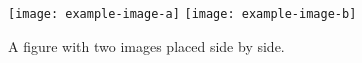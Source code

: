 \begin{figure}[thb] \centering
    \texttt{[image: example-image-a]}
    \texttt{[image: example-image-b]}
    \caption{A figure with two images placed side by side.} \label{fig:figure2}
\end{figure}
